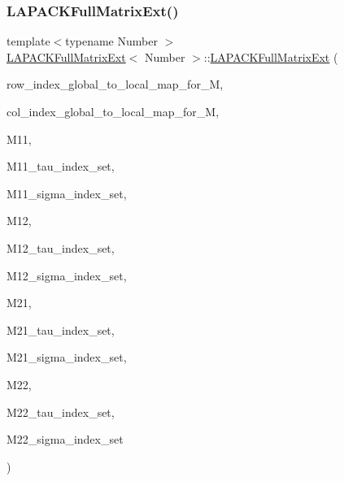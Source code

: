 \subsubsection{\texorpdfstring{L\+A\+P\+A\+C\+K\+Full\+Matrix\+Ext()}{LAPACKFullMatrixExt()}\hspace{0.1cm}{\footnotesize\ttfamily [10/10]}}
{\footnotesize\ttfamily template$<$typename Number $>$ \\
\hyperlink{classLAPACKFullMatrixExt}{L\+A\+P\+A\+C\+K\+Full\+Matrix\+Ext}$<$ Number $>$\+::\hyperlink{classLAPACKFullMatrixExt}{L\+A\+P\+A\+C\+K\+Full\+Matrix\+Ext} (\begin{DoxyParamCaption}\item[{const std\+::map$<$ types\+::global\+\_\+dof\+\_\+index, size\+\_\+t $>$ \&}]{row\+\_\+index\+\_\+global\+\_\+to\+\_\+local\+\_\+map\+\_\+for\+\_\+M,  }\item[{const std\+::map$<$ types\+::global\+\_\+dof\+\_\+index, size\+\_\+t $>$ \&}]{col\+\_\+index\+\_\+global\+\_\+to\+\_\+local\+\_\+map\+\_\+for\+\_\+M,  }\item[{const \hyperlink{classLAPACKFullMatrixExt}{L\+A\+P\+A\+C\+K\+Full\+Matrix\+Ext}$<$ Number $>$ \&}]{M11,  }\item[{const std\+::vector$<$ types\+::global\+\_\+dof\+\_\+index $>$ \&}]{M11\+\_\+tau\+\_\+index\+\_\+set,  }\item[{const std\+::vector$<$ types\+::global\+\_\+dof\+\_\+index $>$ \&}]{M11\+\_\+sigma\+\_\+index\+\_\+set,  }\item[{const \hyperlink{classLAPACKFullMatrixExt}{L\+A\+P\+A\+C\+K\+Full\+Matrix\+Ext}$<$ Number $>$ \&}]{M12,  }\item[{const std\+::vector$<$ types\+::global\+\_\+dof\+\_\+index $>$ \&}]{M12\+\_\+tau\+\_\+index\+\_\+set,  }\item[{const std\+::vector$<$ types\+::global\+\_\+dof\+\_\+index $>$ \&}]{M12\+\_\+sigma\+\_\+index\+\_\+set,  }\item[{const \hyperlink{classLAPACKFullMatrixExt}{L\+A\+P\+A\+C\+K\+Full\+Matrix\+Ext}$<$ Number $>$ \&}]{M21,  }\item[{const std\+::vector$<$ types\+::global\+\_\+dof\+\_\+index $>$ \&}]{M21\+\_\+tau\+\_\+index\+\_\+set,  }\item[{const std\+::vector$<$ types\+::global\+\_\+dof\+\_\+index $>$ \&}]{M21\+\_\+sigma\+\_\+index\+\_\+set,  }\item[{const \hyperlink{classLAPACKFullMatrixExt}{L\+A\+P\+A\+C\+K\+Full\+Matrix\+Ext}$<$ Number $>$ \&}]{M22,  }\item[{const std\+::vector$<$ types\+::global\+\_\+dof\+\_\+index $>$ \&}]{M22\+\_\+tau\+\_\+index\+\_\+set,  }\item[{const std\+::vector$<$ types\+::global\+\_\+dof\+\_\+index $>$ \&}]{M22\+\_\+sigma\+\_\+index\+\_\+set }\end{DoxyParamCaption})}

